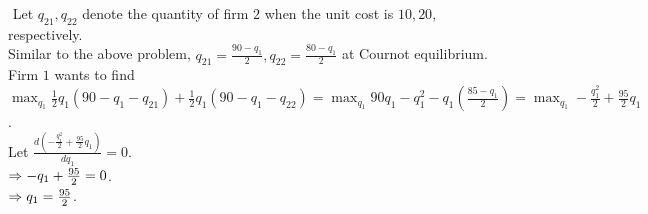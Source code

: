 \begin{pr}$ $
Let $q_{21}, q_{22}$ denote the quantity of firm $2$ when the unit cost is $10, 20$, respectively.\\
Similar to the above problem, $q_{21}=\frac{90-q_1}2, q_{22}=\frac{80-q_1}2$ at Cournot equilibrium.\\
Firm $1$ wants to find $\max_{q_1}\frac12q_1(90-q_1-q_{21})+\frac12q_1(90-q_1-q_{22})=\max_{q_1}90q_1-q_1^2-q_1(\frac{85-q_1}2)=\max_{q_1}-\frac{q_1^2}2+\frac{95}2q_1$.\\
Let $\frac{d(-\frac{q_1^2}2+\frac{95}2q_1)}{dq_1}=0$.\\
$\Rightarrow-q_1+\frac{95}2=0$.\\
$\Rightarrow q_1=\frac{95}2$.
\end{pr}
